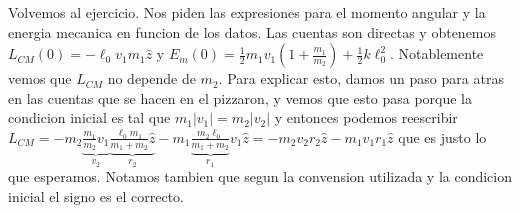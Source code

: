 \documentclass[12pt,a4paper]{article}
\begin{document}
Volvemos al ejercicio. Nos piden las expresiones para el momento angular y la energia mecanica en funcion de los datos. Las cuentas son directas y obtenemos $L_{CM}(0)=-\ell_0v_1m_1\hat{z}$ y 
$E_m(0)=\frac{1}{2}m_1v_1(1+\frac{m_1}{m_2})+\frac{1}{2}k\ell_0^2$. Notablemente vemos que $L_{CM}$ no depende de $m_2$. Para explicar esto, damos un paso para atras en las cuentas que se hacen en el pizzaron, y vemos que esto pasa porque la condicion inicial es tal que $m_1|v_1|=m_2|v_2|$ y entonces podemos reescribir $L_{CM}=-m_2\underbrace{\frac{m_1}{m_2}v_1}_{v_2}\underbrace{\frac{\ell_0m_1}{m_1+m_2}\hat{z}}_{r_2}-m_1\underbrace{\frac{m_2\ell_0}{m_1+m_2}}_{r_1}v_1\hat{z}=-m_2v_2r_2\hat{z}-m_1v_1r_1\hat{z}$ que es justo lo que esperamos. Notamos tambien que segun la convension utilizada y la condicion inicial el signo es el correcto.
\end{document}
